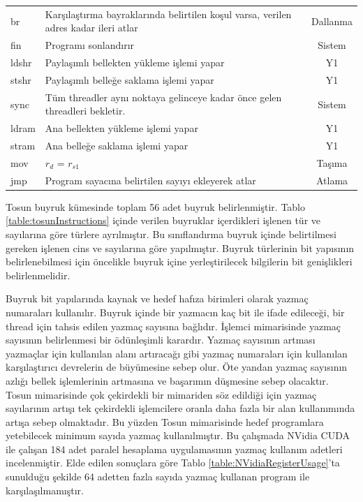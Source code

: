 \begin{longtable}{p{50pt} p{250pt} p{70pt}}
  br 			&	 Karşılaştırma bayraklarında belirtilen koşul varsa, verilen adres kadar ileri atlar & \multicolumn{1}{c}{Dallanma}  \\
  fin 		&	 Programı sonlandırır& \multicolumn{1}{c}{Sistem}  \\
  ldshr 	&	 Paylaşımlı bellekten yükleme işlemi yapar& \multicolumn{1}{c}{Y1}  \\
  stshr 	&	 Paylaşımlı belleğe saklama işlemi yapar& \multicolumn{1}{c}{Y1}  \\
  sync		&	 Tüm threadler aynı noktaya gelinceye kadar önce gelen threadleri bekletir. & \multicolumn{1}{c}{Sistem}  \\
  ldram 	&	 Ana bellekten yükleme işlemi yapar& \multicolumn{1}{c}{Y1}  \\
  stram		&	 Ana belleğe saklama işlemi yapar& \multicolumn{1}{c}{Y1}  \\
  mov 		&  $r_{d}$ = $r_{s1}$ 						&	\multicolumn{1}{c}{Taşıma}		 \\
  jmp  		&  Program sayacına belirtilen sayıyı ekleyerek atlar &	\multicolumn{1}{c}{Atlama}		 \\
  
\end{longtable}

Tosun buyruk kümesinde toplam 56 adet buyruk belirlenmiştir. Tablo \ref{table:tosunInstructions} içinde verilen buyruklar içerdikleri işlenen tür ve sayılarına göre türlere ayrılmıştır. Bu sınıflandırma buyruk içinde belirtilmesi gereken işlenen cins ve sayılarına göre yapılmıştır. Buyruk türlerinin bit yapısının belirlenebilmesi için öncelikle buyruk içine yerleştirilecek bilgilerin bit genişlikleri belirlenmelidir. \par

Buyruk bit yapılarında kaynak ve hedef hafıza birimleri olarak yazmaç numaraları kullanılır. Buyruk içinde bir yazmacın kaç bit ile ifade edileceği, bir thread için tahsis edilen yazmaç sayısına bağlıdır. İşlemci mimarisinde yazmaç sayısının belirlenmesi bir ödünleşimli karardır. Yazmaç sayısının artması yazmaçlar için kullanılan alanı artıracağı gibi yazmaç numaraları için kullanılan karşılaştırıcı devrelerin de büyümesine sebep olur. Öte yandan yazmaç sayısının azlığı bellek işlemlerinin artmasına ve başarımın düşmesine sebep olacaktır. Tosun mimarisinde çok çekirdekli bir mimariden söz edildiği için yazmaç sayılarının artışı tek çekirdekli işlemcilere oranla daha fazla bir alan kullanımında artışa sebep olmaktadır. Bu yüzden Tosun mimarisinde hedef programlara yetebilecek minimum sayıda yazmaç kullanılmıştır. Bu çalışmada NVidia CUDA ile çalışan 184 adet paralel hesaplama uygulamasının yazmaç kullanım adetleri incelenmiştir. Elde edilen sonuçlara göre Tablo \ref{table:NVidiaRegisterUsage}'ta sunulduğu şekilde 64 adetten fazla sayıda yazmaç kullanan program ile karşılaşılmamıştır.

